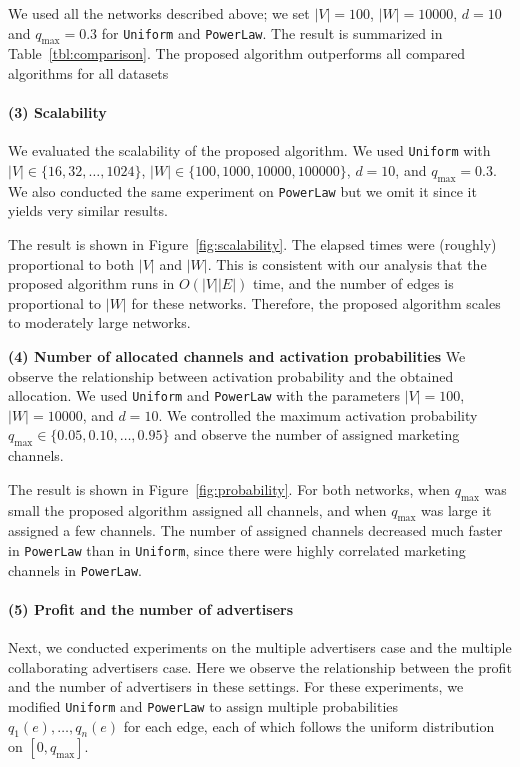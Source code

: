 \documentclass[letterpaper]{article}
\theoremstyle{definition}
\begin{document}
We used all the networks described above; we set $|V| = 100$, $|W| = 10000$, $d = 10$ and $q_{\text{max}} = 0.3$ for \texttt{Uniform} and \texttt{PowerLaw}.
The result is summarized in Table~\ref{tbl:comparison}.
The proposed algorithm outperforms all compared algorithms for all datasets


\vspace{-2.69mm}
\paragraph{(3) Scalability}

We evaluated the scalability of the proposed algorithm.
We used \texttt{Uniform} with $|V| \in \{16, 32, \ldots, 1024\}$, $|W| \in \{100, 1000, 10000, 100000\}$, $d = 10$, and $q_{\text{max}} = 0.3$.
We also conducted the same experiment on \texttt{PowerLaw} but we omit it since it yields very similar results.

The result is shown in Figure~\ref{fig:scalability}.
The elapsed times were (roughly) proportional to both $|V|$ and $|W|$.
This is consistent with our analysis that the proposed algorithm runs in $O(|V| |E|)$ time, and the number of edges is proportional to $|W|$ for these networks.
Therefore, the proposed algorithm scales to moderately large networks.

\textbf{(4) Number of allocated channels and activation probabilities} 
We observe the relationship between activation probability and the obtained allocation.
We used \texttt{Uniform} and \texttt{PowerLaw} with the parameters $|V| = 100$,  $|W| = 10000$, and $d = 10$.
We controlled the maximum activation probability $q_{\text{max}} \in \{0.05, 0.10, \ldots, 0.95\}$ and observe the number of assigned marketing channels.

The result is shown in Figure~\ref{fig:probability}.
For both networks, when $q_{\text{max}}$ was small the proposed algorithm assigned all channels, and when $q_{\text{max}}$ was large it assigned a few channels.
The number of assigned channels decreased much faster in \texttt{PowerLaw} than in \texttt{Uniform}, since there were highly correlated marketing channels in \texttt{PowerLaw}.

\paragraph{(5) Profit and the number of advertisers}

Next, we conducted experiments on the multiple advertisers case and the multiple collaborating advertisers case.
Here we observe the relationship between the profit and the number of advertisers in these settings.
For these experiments, we modified \texttt{Uniform} and \texttt{PowerLaw}
to assign multiple probabilities $q_1(e), \ldots, q_n(e)$ for each edge, each of which follows the uniform distribution on $[0, q_{\text{max}}]$.
\end{document}
